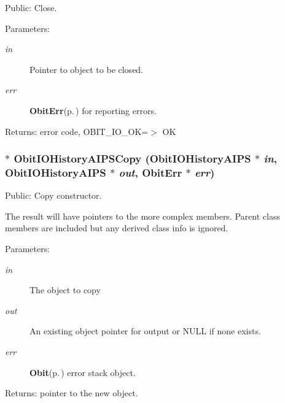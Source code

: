 Public: Close. 

\begin{Desc}
\item[Parameters:]
\begin{description}
\item[{\em in}]Pointer to object to be closed. \item[{\em err}]{\bf Obit\-Err}{\rm (p.\,\pageref{structObitErr})} for reporting errors. \end{description}
\end{Desc}
\begin{Desc}
\item[Returns:]error code, OBIT\_\-IO\_\-OK=$>$ OK \end{Desc}
\subsubsection{$\ast$ Obit\-IOHistory\-AIPSCopy ({\bf Obit\-IOHistory\-AIPS} $\ast$ {\em in}, {\bf Obit\-IOHistory\-AIPS} $\ast$ {\em out}, {\bf Obit\-Err} $\ast$ {\em err})}\label{ObitIOHistoryAIPS_8h_a10}


Public: Copy constructor. 

The result will have pointers to the more complex members. Parent class members are included but any derived class info is ignored. \begin{Desc}
\item[Parameters:]
\begin{description}
\item[{\em in}]The object to copy \item[{\em out}]An existing object pointer for output or NULL if none exists. \item[{\em err}]{\bf Obit}{\rm (p.\,\pageref{structObit})} error stack object. \end{description}
\end{Desc}
\begin{Desc}
\item[Returns:]pointer to the new object. \end{Desc}
